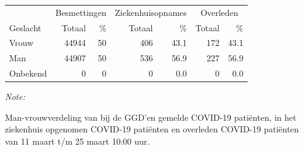 \documentclass[
  english,
  man,floatsintext]{apa6}
\begin{document}
\begin{table}
\centering\begingroup\fontsize{11}{13}\selectfont

\begin{threeparttable}
\begin{tabular}{lrrrrrr}
\toprule
\multicolumn{1}{c}{ } & \multicolumn{2}{c}{Besmettingen} & \multicolumn{2}{c}{Ziekenhuisopnames} & \multicolumn{2}{c}{Overleden} \\
\cmidrule(l{3pt}r{3pt}){2-3} \cmidrule(l{3pt}r{3pt}){4-5} \cmidrule(l{3pt}r{3pt}){6-7}
Geslacht & Totaal & \% & Totaal & \% & Totaal & \%\\
\midrule
Vrouw & 44944 & 50 & 406 & 43.1 & 172 & 43.1\\
Man & 44907 & 50 & 536 & 56.9 & 227 & 56.9\\
Onbekend & 0 & 0 & 0 & 0.0 & 0 & 0.0\\
\bottomrule
\end{tabular}
\begin{tablenotes}
\item \textit{Note: } 
\item Man-vrouwverdeling van bij de GGD’en gemelde COVID-19 patiënten, in het ziekenhuis opgenomen COVID-19 patiënten en overleden COVID-19 patiënten van 11 maart t/m 25 maart 10:00 uur.
\end{tablenotes}
\end{threeparttable}
\endgroup{}
\end{table}
\newpage
\end{document}
